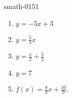 
\begin{corrige}{smath-0151}

    \begin{enumerate}
        \item
            \( y=-5x+3\)
        \item
            \( y=\frac{ 5 }{ 3 }x\)
        \item
            \( y=\frac{ x }{2}+\frac{ 5 }{2}\)
        \item
            \( y=7\)
        \item
            \( f(x)=\frac{ 8 }{ 9 }x+\frac{ 10 }{ 9 }\).
    \end{enumerate}

\end{corrige}
